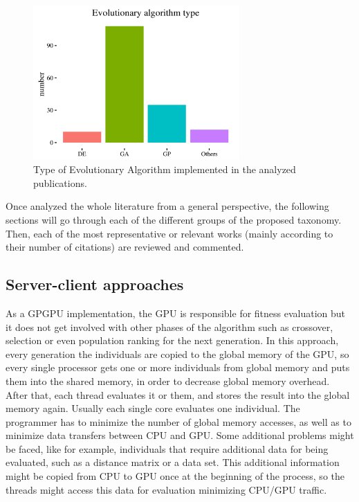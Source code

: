 \documentclass{article}
\begin{document}
\begin{figure}[!ht]
\centering
\includegraphics[clip,width=0.7\textwidth]{algorithmtype}
\caption{Type of Evolutionary Algorithm implemented in the analyzed publications.}
\label{figure:type_algorithm}
\end{figure}

Once analyzed the whole literature from a general perspective, the following sections will go through each of the different groups of the proposed taxonomy. Then, each of the most representative or relevant works (mainly according to their number of citations) are reviewed and commented.


\subsection{Server-client approaches}
\label{sec:serverClient}

As a GPGPU implementation, the GPU is responsible for fitness
evaluation but it does not get involved with other phases of the
algorithm such as crossover, selection or even population ranking for
the next generation. In this approach, every generation the
individuals are copied to the global memory of the GPU, so every
single processor gets one or more individuals from global memory and
puts them into the shared memory, in order to decrease global memory
overhead. After that, each thread evaluates it or them, and stores the
result into the global memory again. Usually each single core
evaluates one individual. The programmer has to minimize the number of
global memory accesses, as well as to minimize data transfers between
CPU and GPU. Some additional problems might be faced, like for
example, individuals that require additional data for being evaluated,
such as a distance matrix or a data set. This additional information
might be copied from CPU to GPU once at the beginning of the process,
so the threads might access this data for evaluation minimizing CPU/GPU
traffic.
\end{document}

